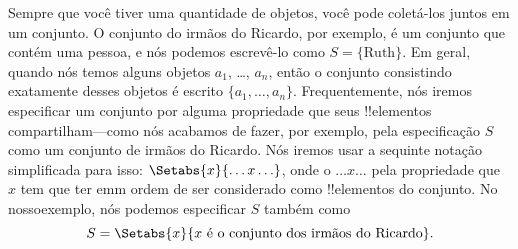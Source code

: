\documentclass[../../../include/open-logic-section]{subfiles}
\begin{document}
\begin{ex}
Sempre que você tiver uma quantidade de objetos, você pode coletá-los juntos
em um conjunto. O conjunto do irmãos do Ricardo, por exemplo, é um conjunto
que contém uma pessoa, e nós podemos escrevê-lo como $S=\{\textrm{Ruth}\}$.
Em geral, quando nós temos alguns objetos $a_{1}$, \dots, $a_{n}$, então
o conjunto consistindo exatamente desses objetos é escrito $\{
a_{1}, \dots, a_{n}\}$. Frequentemente, nós iremos especificar um conjunto
por alguma propriedade que seus !!{elemento}s compartilham---como nós acabamos
de fazer, por exemplo, pela especificação $S$ como um conjunto de irmãos do
Ricardo. Nós iremos usar a sequinte notação simplificada para isso: 
$\Setabs{x}{\ldots x\ldots}$, onde o $\ldots x\ldots$ %
pela propriedade que $x$ tem que ter emm ordem de ser considerado como
!!{elemento}s do conjunto. No nossoexemplo, nós podemos especificar $S$
também como
\[
S = \Setabs{x}{x \text{ é o conjunto dos irmãos do Ricardo}}.
\]
\end{ex}

\end{document}
